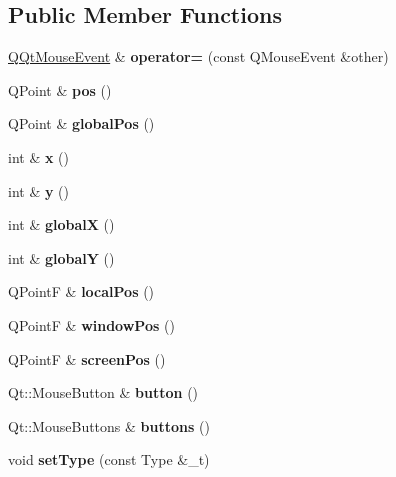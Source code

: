 \subsection*{Public Member Functions}
\begin{DoxyCompactItemize}
\item 
\mbox{\label{class_q_qt_mouse_event_a02429ae21668aa941782ecf544a7d456}} 
\mbox{\hyperlink{class_q_qt_mouse_event}{Q\+Qt\+Mouse\+Event}} \& {\bfseries operator=} (const Q\+Mouse\+Event \&other)
\item 
\mbox{\label{class_q_qt_mouse_event_af372a76ea9b5a13fe7d59ded064acc97}} 
Q\+Point \& {\bfseries pos} ()
\item 
\mbox{\label{class_q_qt_mouse_event_a31e01c0f790c4fbd38c5a3a24c2bdde0}} 
Q\+Point \& {\bfseries global\+Pos} ()
\item 
\mbox{\label{class_q_qt_mouse_event_a115c1a73bc8e57dccf37ef6526c97a48}} 
int \& {\bfseries x} ()
\item 
\mbox{\label{class_q_qt_mouse_event_a0e92d0a9bda5275a288123fd47d28d55}} 
int \& {\bfseries y} ()
\item 
\mbox{\label{class_q_qt_mouse_event_a9e2ac3b8df5475567816bbea4c2412a3}} 
int \& {\bfseries globalX} ()
\item 
\mbox{\label{class_q_qt_mouse_event_a1f95cb6c8c1a02a4ec74e9d01a113dd0}} 
int \& {\bfseries globalY} ()
\item 
\mbox{\label{class_q_qt_mouse_event_ac99607a8c9ebaed0fc6116bc44e629b8}} 
Q\+PointF \& {\bfseries local\+Pos} ()
\item 
\mbox{\label{class_q_qt_mouse_event_aa6fe98e703f482392a21047902598975}} 
Q\+PointF \& {\bfseries window\+Pos} ()
\item 
\mbox{\label{class_q_qt_mouse_event_a95995f5e3f5e13a6d04911487d7db43e}} 
Q\+PointF \& {\bfseries screen\+Pos} ()
\item 
\mbox{\label{class_q_qt_mouse_event_a0b612eec472ab7d3408a1f9224b6a26a}} 
Qt\+::\+Mouse\+Button \& {\bfseries button} ()
\item 
\mbox{\label{class_q_qt_mouse_event_a8480d4213616a531ad33d3649c016771}} 
Qt\+::\+Mouse\+Buttons \& {\bfseries buttons} ()
\item 
\mbox{\label{class_q_qt_mouse_event_a539be3a0be3af32a0fa6710793d558c7}} 
void {\bfseries set\+Type} (const Type \&\+\_\+t)
\end{DoxyCompactItemize}
